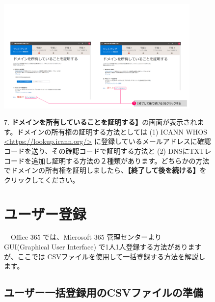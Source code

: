 \begin{figure}[h]
    \begin{minipage}{0.6\textwidth}
        \vspace{-1cm}\hspace{-0.5cm}
        \includegraphics[width=10cm]{figures/M365_setting1-05.png}
    \end{minipage}
    \begin{minipage}{0.4\textwidth}
        7. \textbf{ドメインを所有していることを証明する】}の画面が表示されます。ドメインの所有権の証明する方法としては (1) ICANN WHOS \url{<https://lookup.icann.org/>} に登録しているメールアドレスに確認コードを送り、その確認コードで証明する方法と (2) DNSにTXTレコードを追加し証明する方法の２種類があります。どちらかの方法でドメインの所有権を証明しましたら、\textbf{【終了して後を続ける】}をクリックしてください。
    \end{minipage}
\end{figure}

\begin{figure}[h]
    \begin{minipage}{1.0\textwidth}
        \section{ユーザー登録}
        \label{sec:ユーザー登録}
    \end{minipage}
\end{figure}

\begin{figure}[h]
    \begin{minipage}{1.0\textwidth}
        　Office 365 では、Microsoft 365 管理センターより　GUI(Graphical User Interface) で1人1人登録する方法がありますが、ここでは CSVファイルを使用して一括登録する方法を解説します。
    \end{minipage}
\end{figure}

\begin{figure}[h]
    \begin{minipage}{1.0\textwidth}
        \subsection{ユーザー一括登録用のCSVファイルの準備}
    \end{minipage}
\end{figure}
